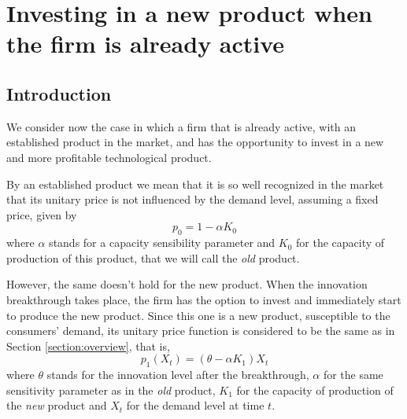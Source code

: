 
\chapter{Investing in a new product when the firm is already active}
\label{chapter:2}



\section{Introduction}
\label{section:2_intro}

We consider now the case in which a firm that is already active, with an established product in the market, and has the opportunity to invest in a new and more profitable technological product.

By an established product we mean that it is so well recognized in the market that its unitary price is not influenced by the demand level, assuming a fixed price, given by
\begin{equation}
p_0=1-\alpha K_0
\label{p0}
\end{equation}
where $\alpha$ stands for a capacity sensibility parameter and $K_0$ for the capacity of production of this product, that we will call the \textit{old} product.

However, the same doesn't hold for the new product. When the innovation breakthrough takes place, the firm has the option to invest and immediately start to produce the new product. Since this one is a new product, susceptible to the consumers' demand, its unitary price function is considered to be the same as in Section \ref{section:overview}, that is,
\begin{equation}
p_1(X_t)=(\theta-\alpha K_1)X_t
\label{p1}
\end{equation}
where $\theta$ stands for the innovation level after the breakthrough, $\alpha$ for the same sensitivity parameter as in the \textit{old} product, $K_1$ for the capacity of production of the \textit{new} product and $X_t$ for the demand level at time $t$.

